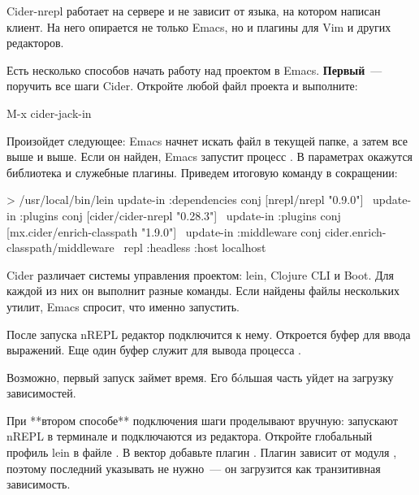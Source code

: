 Cider-nrepl работает на сервере и не зависит от языка, на котором написан клиент. На него опирается не только Emacs, но и плагины для Vim и других редакторов.

Есть несколько способов начать работу над проектом в Emacs. \textbf{Первый}~--- поручить все шаги Cider. Откройте любой файл проекта и выполните:

\begin{english}
  \begin{text}
M-x cider-jack-in
  \end{text}
\end{english}

Произойдет следующее: Emacs начнет искать файл  в текущей папке, а затем все выше и выше. Если он найден, Emacs запустит процесс . В параметрах окажутся библиотека  и служебные плагины. Приведем итоговую команду в сокращении:

\begin{english}
  \begin{bash}
> /usr/local/bin/lein
  update-in :dependencies conj [nrepl/nrepl "0.9.0"] \
  update-in :plugins conj [cider/cider-nrepl "0.28.3"] \
  update-in :plugins conj [mx.cider/enrich-classpath "1.9.0"] \
  update-in :middleware conj cider.enrich-classpath/middleware \
  repl :headless :host localhost
  \end{bash}
\end{english}

Cider различает системы управления проектом: lein, Clojure CLI и Boot. Для каждой из них он выполнит разные команды. Если найдены файлы нескольких утилит, Emacs спросит, что именно запустить.

После запуска nREPL редактор подключится к нему. Откроется буфер  для ввода выражений. Еще один буфер  служит для вывода процесса .

Возможно, первый запуск \code{cider-jack-in} займет время. Его бóльшая часть уйдет на загрузку зависимостей.

При **втором способе** подключения шаги проделывают вручную: запускают nREPL в терминале и подключаются из редактора. Откройте глобальный профиль lein в файле \code{~/.lein/profiles.clj}. В вектор  \arr {} добавьте плагин . Плагин зависит от модуля , поэтому последний указывать не нужно~--- он загрузится как транзитивная зависимость.

